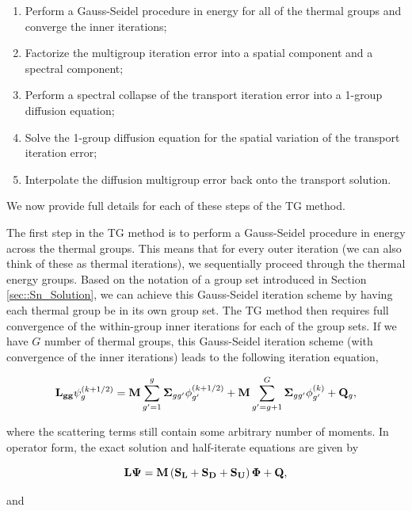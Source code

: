 \begin{enumerate}
\item Perform a Gauss-Seidel procedure in energy for all of the thermal groups and converge the inner iterations;
\item Factorize the multigroup iteration error into a spatial component and a spectral component;
\item Perform a spectral collapse of the transport iteration error into a 1-group diffusion equation;
\item Solve the 1-group diffusion equation for the spatial variation of the transport iteration error;
\item Interpolate the diffusion multigroup error back onto the transport solution.
\end{enumerate}

\noindent We now provide full details for each of these steps of the TG method.

The first step in the TG method is to perform a Gauss-Seidel procedure in energy across the thermal groups. This means that for every outer iteration (we can also think of these as thermal iterations), we sequentially proceed through the thermal energy groups. Based on the notation of a group set introduced in Section \ref{sec::Sn_Solution}, we can achieve this Gauss-Seidel iteration scheme by having each thermal group be in its own group set. The TG method then requires full convergence of the within-group inner iterations for each of the group sets. If we have $G$ number of thermal groups, this Gauss-Seidel iteration scheme (with convergence of the inner iterations) leads to the following iteration equation,

\begin{equation}
\label{eq::DSA_TG_trans_it_eq}
{\bf L_{gg}} \psi_g^{(k+1/2)} = {\bf M} \sum_{g'=1}^g {\bf \Sigma}_{g g'} \phi_{g'}^{(k+1/2)} + {\bf M} \sum_{g'=g+1}^G {\bf \Sigma}_{g g'} \phi_{g'}^{(k)} + {\bf Q}_g ,
\end{equation}

\noindent where the scattering terms still contain some arbitrary number of moments. In operator form, the exact solution and half-iterate equations are given by

\begin{equation}
\label{eq::DSA_TG_trans_eq_ops}
{\bf L} {\bf \Psi} = {\bf M} \left( {\bf S_L} +  {\bf S_D} + {\bf S_U} \right) {\bf \Phi} + {\bf Q} ,
\end{equation}

\noindent and

